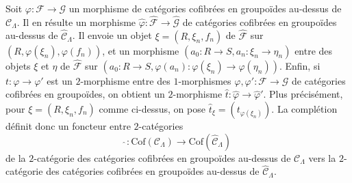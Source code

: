 \begin{remark}
\label{remark-completion-morphism}
Soit $\varphi : \mathcal{F} \to \mathcal{G}$ un morphisme de catégories
cofibrées en groupoïdes au-dessus de $\mathcal{C}_\Lambda$. Il en résulte un
morphisme
$\widehat{\varphi}: \widehat{\mathcal{F}} \to \widehat{\mathcal{G}}$
de catégories cofibrées en groupoïdes au-dessus de
$\widehat{\mathcal{C}}_\Lambda$. Il envoie un objet
$\xi = (R, \xi_n, f_n)$ de $\widehat{\mathcal{F}}$ sur
$(R, \varphi(\xi_n), \varphi(f_n))$, et un morphisme
$(a_0 : R \to S, a_n : \xi_n \to \eta_n)$ entre des objets $\xi$ et $\eta$
de $\widehat{\mathcal{F}}$ sur
$(a_0 : R \to S, \varphi(a_n) : \varphi(\xi_n) \to \varphi(\eta_n))$.
Enfin, si $t : \varphi \to \varphi'$ est un $2$-morphisme entre des
$1$-morphismes $\varphi, \varphi': \mathcal{F} \to \mathcal{G}$ de
catégories cofibrées en groupoïdes, on obtient un $2$-morphisme
$\widehat{t} : \widehat{\varphi} \to \widehat{\varphi}'$. Plus précisément,
pour $\xi = (R, \xi_n, f_n)$ comme ci-dessus, on pose
$\widehat{t}_\xi = (t_{\varphi(\xi_n)})$. La complétion définit donc un
foncteur entre $2$-catégories
$$
\widehat{~} :
\text{Cof}(\mathcal{C}_\Lambda)
\longrightarrow
\text{Cof}(\widehat{\mathcal{C}}_\Lambda)
$$
de la $2$-catégorie des catégories cofibrées en groupoïdes au-dessus de
$\mathcal{C}_\Lambda$ vers la $2$-catégorie des catégories cofibrées en
groupoïdes au-dessus de $\widehat{\mathcal{C}}_\Lambda$.
\end{remark}

